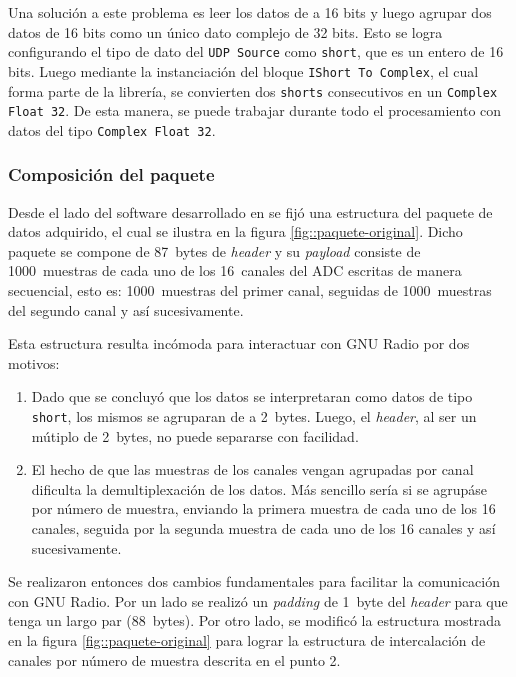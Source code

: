 \documentclass[../../main.tex]{subfiles}
\begin{document}
Una solución a este problema es leer los datos de a 16 bits y luego agrupar dos datos de 16 bits como un único dato complejo de 32 bits. Esto se logra configurando el tipo de dato del \texttt{UDP Source} como \texttt{short}, que es un entero de 16 bits. Luego mediante la instanciación del bloque \texttt{IShort To Complex}, el cual forma parte de la librería, se convierten dos \texttt{shorts} consecutivos en un \texttt{Complex Float 32}. De esta manera, se puede trabajar durante todo el procesamiento con datos del tipo \texttt{Complex Float 32}.

\subsubsection{Composición del paquete}
Desde el lado del software desarrollado en \cite{proyecto-jose} se fijó una estructura del paquete de datos adquirido, el cual se ilustra en la figura \ref{fig::paquete-original}. Dicho paquete se compone de 87~bytes de \textit{header} y su \textit{payload} consiste de 1000~muestras de cada uno de los 16~canales del ADC escritas de manera secuencial, esto es: 1000~muestras del primer canal, seguidas de 1000~muestras del segundo canal y así sucesivamente.

Esta estructura resulta incómoda para interactuar con GNU Radio por dos motivos:
\begin{enumerate}
    \item Dado que se concluyó que los datos se interpretaran como datos de tipo \texttt{short}, los mismos se agruparan de a 2~bytes. Luego, el \textit{header}, al ser un mútiplo de 2~bytes, no puede separarse con facilidad.
    
    \item El hecho de que las muestras de los canales vengan agrupadas por canal dificulta la demultiplexación de los datos. Más sencillo sería si se agrupáse por número de muestra, enviando la primera muestra de cada uno de los 16 canales, seguida por la segunda muestra de cada uno de los 16 canales y así sucesivamente.
\end{enumerate}

Se realizaron entonces dos cambios fundamentales para facilitar la comunicación con GNU Radio. Por un lado se realizó un \textit{padding} de 1~byte del \textit{header} para que tenga un largo par (88~bytes). Por otro lado, se modificó la estructura mostrada en la figura \ref{fig::paquete-original} para lograr la estructura de intercalación de canales por número de muestra descrita en el punto 2.
\end{document}
